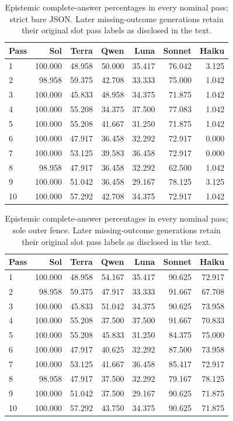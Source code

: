 \documentclass[a4paper,preprint,12pt,numbers,nopreprintline]{elsarticle}
\begin{document}
\begin{table}[htbp]\centering\scriptsize
\caption{Epistemic complete-answer percentages in every nominal pass; strict bare JSON. Later missing-outcome generations retain their original slot pass labels as disclosed in the text.}\label{tab:rounds-epistemic-primary}
\setlength{\tabcolsep}{3pt}
\begin{tabular}{lrrrrrr}\toprule
Pass & Sol & Terra & Qwen & Luna & Sonnet & Haiku\\\midrule
1 & 100.000 & 48.958 & 50.000 & 35.417 & 76.042 & 3.125\\
2 & 98.958 & 59.375 & 42.708 & 33.333 & 75.000 & 1.042\\
3 & 100.000 & 45.833 & 48.958 & 34.375 & 71.875 & 1.042\\
4 & 100.000 & 55.208 & 34.375 & 37.500 & 77.083 & 1.042\\
5 & 100.000 & 55.208 & 41.667 & 31.250 & 71.875 & 1.042\\
6 & 100.000 & 47.917 & 36.458 & 32.292 & 72.917 & 0.000\\
7 & 100.000 & 53.125 & 39.583 & 36.458 & 72.917 & 0.000\\
8 & 98.958 & 47.917 & 36.458 & 32.292 & 62.500 & 1.042\\
9 & 100.000 & 51.042 & 36.458 & 29.167 & 78.125 & 3.125\\
10 & 100.000 & 57.292 & 42.708 & 34.375 & 72.917 & 1.042\\
\bottomrule\end{tabular}
\end{table}
\begin{table}[htbp]\centering\scriptsize
\caption{Epistemic complete-answer percentages in every nominal pass; sole outer fence. Later missing-outcome generations retain their original slot pass labels as disclosed in the text.}\label{tab:rounds-epistemic-framing_sensitivity}
\setlength{\tabcolsep}{3pt}
\begin{tabular}{lrrrrrr}\toprule
Pass & Sol & Terra & Qwen & Luna & Sonnet & Haiku\\\midrule
1 & 100.000 & 48.958 & 54.167 & 35.417 & 90.625 & 72.917\\
2 & 98.958 & 59.375 & 47.917 & 33.333 & 91.667 & 67.708\\
3 & 100.000 & 45.833 & 51.042 & 34.375 & 90.625 & 73.958\\
4 & 100.000 & 55.208 & 37.500 & 37.500 & 91.667 & 70.833\\
5 & 100.000 & 55.208 & 45.833 & 31.250 & 84.375 & 75.000\\
6 & 100.000 & 47.917 & 40.625 & 32.292 & 87.500 & 73.958\\
7 & 100.000 & 53.125 & 41.667 & 36.458 & 85.417 & 72.917\\
8 & 98.958 & 47.917 & 37.500 & 32.292 & 79.167 & 78.125\\
9 & 100.000 & 51.042 & 37.500 & 29.167 & 90.625 & 71.875\\
10 & 100.000 & 57.292 & 43.750 & 34.375 & 90.625 & 71.875\\
\bottomrule\end{tabular}
\end{table}
\end{document}
